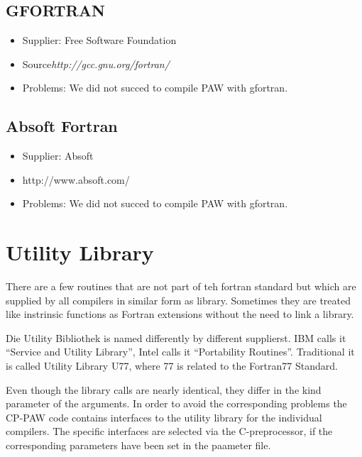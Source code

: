 \documentclass[a4paper,10pt]{report}
\begin{document}
\subsection{GFORTRAN}
\begin{itemize}
\item Supplier: Free Software Foundation
\item Source\textit{http://gcc.gnu.org/fortran/}
\item Problems: We did not succed to compile PAW with gfortran.
\end{itemize}


\subsection{Absoft Fortran}
\begin{itemize}
\item Supplier: Absoft
\item http://www.absoft.com/
\item Problems: We did not succed to compile PAW with gfortran.
\end{itemize}


\section{Utility Library}
\label{sec:utility}
There are a few routines that are not part of teh fortran standard but
which are supplied by all compilers in similar form as
library. Sometimes they are treated like instrinsic functions as
Fortran extensions without the need to link a library.

Die Utility Bibliothek is named differently by different supplierst. IBM calls it
``Service and Utility Library'', Intel calls it ``Portability
Routines''. Traditional it is called  Utility Library U77, where 77
is related to the  Fortran77 Standard.

Even though the library calls are nearly identical, they differ in the
kind parameter of the arguments. In order to avoid the corresponding
problems the CP-PAW code contains interfaces to the utility library
for the individual compilers. The specific interfaces are selected via
the C-preprocessor, if the corresponding parameters have been set in
the paameter file.
\end{document}
